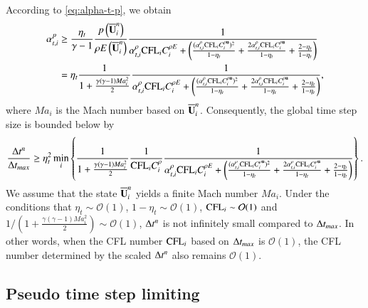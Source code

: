 According to \eqref{eq:alpha-t-p}, we obtain
\begin{equation}
    \begin{aligned}
        \label{eq:alpha-t-p-lb}
        \alpha_{t,i}^{p} 
        & \geq \dfrac{\eta_t}{\gamma-1} \frac{p\left(\overline{\mathbf{U}}^n_i\right)}{
            \rho E\left(\overline{\mathbf{U}}^n_i\right)
        }
        \frac{1}{
         \alpha_{t,i}^\rho\text{CFL}_i C^{\rho E}_i  
            +\left(
            \frac{(\alpha_{t,i}^\rho\text{CFL}_i C^{\rho \mathbf{u}}_i)^2}{1-\eta_t}
            +\frac{2\alpha_{t,i}^\rho\text{CFL}_i C^{\rho \mathbf{u}}_i}{1-\eta_t}
            + \frac{2-\eta_t}{1-\eta_t}
            \right)
        } \\
        & = \eta_t \frac{1}{
           1 + \frac{\gamma (\gamma-1) Ma_i^2}{2}
        }
        \frac{1}{
         \alpha_{t,i}^\rho\text{CFL}_i C^{\rho E}_i  
            +\left(
            \frac{(\alpha_{t,i}^\rho\text{CFL}_i C^{\rho \mathbf{u}}_i)^2}{1-\eta_t}
            +\frac{2\alpha_{t,i}^\rho\text{CFL}_i C^{\rho \mathbf{u}}_i}{1-\eta_t}
            + \frac{2-\eta_t}{1-\eta_t}
            \right)
        },
    \end{aligned}
\end{equation}
where $Ma_i$ is the Mach number based on $\overline{\mathbf{U}}^n_i$. 
Consequently, the global time step size is bounded below by
\begin{equation}
    \label{eq:delta-t-lb}
    \frac{\mathrm\Delta t^n}{\mathrm\Delta t_{max}} \geq 
    \eta_t^2
    \min_i
    \left\{
    \frac{1}{
           1 + \frac{\gamma (\gamma-1) Ma_i^2}{2}
        }
    \frac{1}{\text{CFL}_i C_i^\rho}
    \frac{1}{
     \alpha_{t,i}^\rho\text{CFL}_i C^{\rho E}_i  
        +\left(
        \frac{(\alpha_{t,i}^\rho\text{CFL}_i C^{\rho \mathbf{u}}_i)^2}{1-\eta_t}
        +\frac{2\alpha_{t,i}^\rho\text{CFL}_i C^{\rho \mathbf{u}}_i}{1-\eta_t}
        + \frac{2-\eta_t}{1-\eta_t}
        \right)
    }
    \right\}.
\end{equation}
We assume that the state $\overline{\mathbf{U}}^n_i$ yields a finite Mach number $Ma_i$.
Under the conditions that $\eta_t\sim\mathcal{O}(1)$, $1-\eta_t\sim\mathcal{O}(1)$,
$\text{CFL}_i\sim\mathcal{O}(1)$ and ${1}/\left(1 + \frac{\gamma (\gamma-1) Ma_i^2}{2}\right)\sim\mathcal{O}(1)$,
$\mathrm\Delta t^n$ is not infinitely small compared to $\mathrm\Delta t_{max}$.
In other words, when the CFL number $\text{CFL}_i$ based on $\mathrm\Delta t_{max}$ is $\mathcal{O}(1)$, 
the CFL number determined by the scaled $\mathrm\Delta t^n$ also remains $\mathcal{O}(1)$.


\subsection{Pseudo time step limiting}
\label{ssec:pseudo-limiting}

